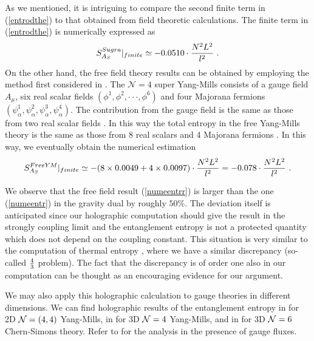 \documentclass[12pt]{article}
\def\frac#1#2{{#1\over #2}}
\def\CN{{\cal N}}
\def\f {\frac}
\def\ap{\alpha}
\def\ddd{\cdot\cdot\cdot}
\def\frac#1#2{{#1\over #2}}
\def\CN{{\cal N}}
\def\be{\begin{equation}}
\def\ee{\end{equation}}
\begin{document}
As we mentioned, it is intriguing to compare
the second finite term in (\ref{entrodthe}) to that obtained from field theoretic
calculations. The finite term in (\ref{entrodthe})
is numerically expressed as \be
S^{Sugra}_{A_S}|_{finite}\simeq-0.0510\cdot
\f{N^2L^2}{l^2} \ .\label{numeentr}\ee On the other hand, the free
field theory results can be obtained by employing the method first considered in
\cite{Casini05b}. The ${\mathcal N}=4$
super Yang-Mills consists of a gauge field $A_{\mu}$, six real
scalar fields $(\phi^1,\phi^2,\ddd,\phi^6)$ and four Majorana
fermions $(\psi^1_\ap,\psi^2_\ap,\psi^3_\ap,\psi^4_\ap)$. The contribution
from the gauge field is the same as those from two real scalar
fields \cite{Kabat}. In this way the total entropy in the free Yang-Mills theory
is the same as those from 8 real scalars and 4 Majorana fermions .
In this way, we eventually obtain the numerical estimation \cite{RuTa,RuTaL} \be S^{Free
YM}_{A_S}|_{finite}\simeq -(8\times 0.0049+4\times 0.0097)\cdot
\f{N^2L^2}{l^2}=-0.078 \cdot \f{N^2L^2}{l^2} \ .\label{numeentrr}\ee

We
observe that the free field result (\ref{numeentrr}) is larger
than the one (\ref{numeentr}) in the
gravity dual by roughly $50\%$. The deviation itself is anticipated
since our holographic computation should give the result in the strongly coupling
limit and the entanglement entropy is not a protected quantity which does not depend on the
coupling constant. This
situation is very similar to the computation of thermal entropy
\cite{GKP}, where we have a similar discrepancy (so-called
$\f{4}{3}$ problem). The fact that the discrepancy is of order one
also in our computation can be thought as an encouraging evidence
for our argument.

We may also apply this holographic calculation to gauge theories in different dimensions.
We can find holographic results of the entanglement entropy in
\cite{Arean:2008az} for 2D $\CN =(4,4)$ Yang-Mills,
in  \cite{Ramallo:2008ew} for 3D $\CN =4$ Yang-Mills, and in \cite{Nishioka:2008gz}
for 3D $\CN =6$ Chern-Simons theory. Refer to\cite{Barbon:2008sr,Barbon:2008ut}
for the analysis in the presence of gauge fluxes.
\end{document}
